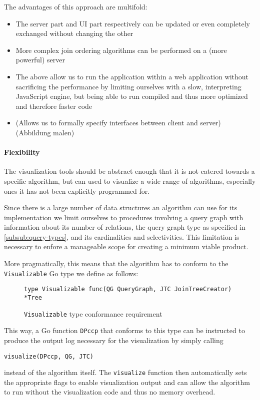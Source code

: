The advantages of this approach are multifold:
\begin{itemize}
    \item The server part and UI part respectively can be
          updated or even completely exchanged without 
          changing the other
    \item More complex join ordering algorithms can be 
          performed on a (more powerful) server
    \item The above allow us to run the application 
          within a web application without sacrificing 
          the performance by limiting ourselves with a 
          slow, interpreting JavaScript engine, but being 
          able to run compiled and thus more optimized and therefore faster 
          code
    \item (Allows us to formally specify interfaces between
          client and server) (Abbildung malen)
\end{itemize}

\paragraph{Flexibility}
The visualization tools should be abstract enough that it is not catered towards a specific algorithm, but can used to visualize a wide range of algorithms, especially ones it has not been explicitly programmed for.  

Since there is a large number of data structures an algorithm can use for its implementation we limit ourselves to procedures involving a query graph with information about its number of relations, the query graph type as specified in \ref{subsub:query-types}, and its cardinalities and selectivities.
This limitation is necessary to enfore a manageable scope for creating a minimum viable product.

More pragmatically, this means that the algorithm has to 
conform to the \texttt{Visualizable} Go type we define as 
follows:

\begin{figure}[H]
    \begin{verbatim}
type Visualizable func(QG QueryGraph, JTC JoinTreeCreator) *Tree
    \end{verbatim}
    \caption{\texttt{Visualizable} type conformance requirement}
    \centering
\end{figure}

\begin{example}
This way, a Go function \texttt{DPccp} that conforms to this type can be instructed to produce the output  log necessary for the visualization by simply calling 

\begin{verbatim}
visualize(DPccp, QG, JTC)
\end{verbatim}
instead of the algorithm itself. The \texttt{visualize} function then automatically sets the appropriate flags to enable visualization output and can allow the algorithm to run without the visualization code and thus no memory overhead.

\end{example}

